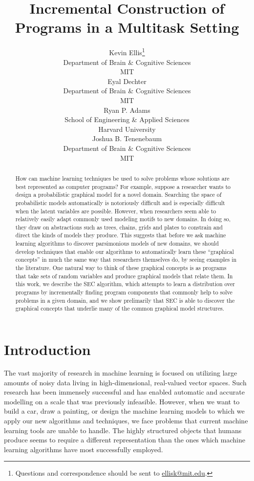 \documentclass{article} %
\title{Incremental Construction of Programs in a Multitask Setting}
\author{
Kevin Ellis\thanks{Questions and correspondence should be sent to 
\href{mailto:ellisk@mit.edu}{ellisk@mit.edu}.} \\
Department of Brain \& Cognitive Sciences\\
MIT\\
\And
Eyal Dechter \\
Department of Brain \& Cognitive Sciences\\
MIT\\
\AND
Ryan P. Adams \\
School of Engineering \& Applied Sciences \\
Harvard University\\
\And
Joshua B. Tenenebaum \\
Department of Brain \& Cognitive Sciences\\
MIT\\
}
\begin{document}
\maketitle

\begin{abstract}
How can machine learning techniques be used to solve problems whose solutions are best represented as computer programs? For example, suppose a researcher wants to design a probabilistic graphical model for a novel domain. Searching the space of probabilistic models automatically is notoriously difficult and is especially difficult when the latent variables are possible. However, when researchers seem able to relatively easily adapt commonly used modeling motifs to new domains. In doing so, they draw on abstractions such as trees, chains, grids and plates to constrain and direct the kinds of models they produce. This suggests that before we ask machine learning algorithms to discover parsimonious models of new domains, we should develop techniques that enable our algorithms to automatically learn these ``graphical concepts'' in much the same way that researchers themselves do, by seeing examples in the literature. One natural way to think of these graphical concepts is as programs that take sets of random variables and produce graphical models that relate them. In this work, we describe the SEC algorithm, which attempts to learn a distribution over programs by incrementally finding program components that commonly help to solve problems in a given domain, and we show prelimarily that SEC is able to discover the graphical concepts that underlie many of the common graphical model structures.  
\end{abstract}


\section{Introduction}


The vast majority of research in machine learning is focused on utilizing large amounts of noisy data living in high-dimensional, real-valued vector spaces. Such research has been immensely successful and has enabled automatic and accurate modelling on a scale that was previously infeasible. However, when we want to build a car, draw a painting, or design the machine learning models to which we apply our new algorithms and techniques, we face problems that current machine learning tools are unable to handle. The highly structured objects that humans produce seems to require a different representation than the ones which machine learning algorithms have most successfully employed. 
\end{document}
